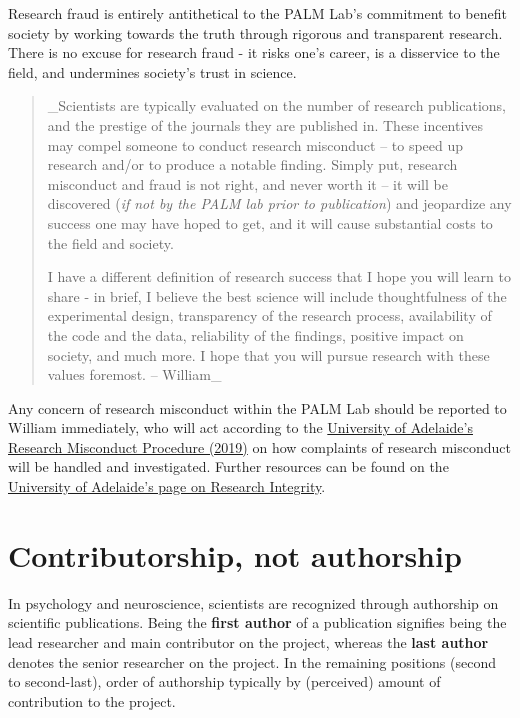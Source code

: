 \documentclass[
]{book}
\begin{document}
Research fraud is entirely antithetical to the PALM Lab's commitment to benefit society by working towards the truth through rigorous and transparent research. There is no excuse for research fraud - it risks one's career, is a disservice to the field, and undermines society's trust in science.

\begin{quote}
\_Scientists are typically evaluated on the number of research publications, and the prestige of the journals they are published in. These incentives may compel someone to conduct research misconduct -- to speed up research and/or to produce a notable finding. Simply put, research misconduct and fraud is not right, and never worth it -- it will be discovered (\emph{if not by the PALM lab prior to publication}) and jeopardize any success one may have hoped to get, and it will cause substantial costs to the field and society.

I have a different definition of research success that I hope you will learn to share - in brief, I believe the best science will include thoughtfulness of the experimental design, transparency of the research process, availability of the code and the data, reliability of the findings, positive impact on society, and much more. I hope that you will pursue research with these values foremost. -- William\_
\end{quote}

Any concern of research misconduct within the PALM Lab should be reported to William immediately, who will act according to the \href{https://www.adelaide.edu.au/policies/96/?dsn=policy.document;field=data;id=7885;m=view}{University of Adelaide's Research Misconduct Procedure (2019)} on how complaints of research misconduct will be handled and investigated. Further resources can be found on the \href{https://www.adelaide.edu.au/staff/research/ethics-compliance-integrity/research-integrity}{University of Adelaide's page on Research Integrity}.

\hypertarget{contributorship}{%
\section{Contributorship, not authorship}\label{contributorship}}

In psychology and neuroscience, scientists are recognized through authorship on scientific publications. Being the \textbf{first author} of a publication signifies being the lead researcher and main contributor on the project, whereas the \textbf{last author} denotes the senior researcher on the project. In the remaining positions (second to second-last), order of authorship typically by (perceived) amount of contribution to the project.
\end{document}
